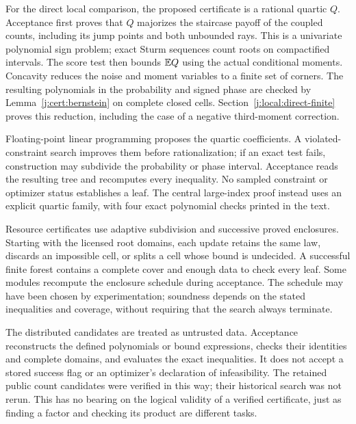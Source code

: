 For the direct local comparison, the proposed certificate is a rational
quartic $Q$. Acceptance first proves that $Q$ majorizes the staircase
payoff of the coupled counts, including its jump points and both
unbounded rays. This is a univariate polynomial sign problem; exact
Sturm sequences count roots on compactified intervals. The score test
then bounds $\mathbb E Q$ using the actual conditional moments. Concavity
reduces the noise and moment variables to a finite set of corners.
The resulting polynomials in the probability and signed phase are
checked by Lemma~\ref{j:cert:bernstein} on complete closed cells.
Section~\ref{j:local:direct-finite} proves this reduction, including
the case of a negative third-moment correction.

Floating-point linear programming proposes the quartic coefficients.
A violated-constraint search improves them before rationalization;
if an exact test fails, construction may subdivide the probability or
phase interval. Acceptance reads the resulting tree and recomputes every
inequality. No sampled constraint or optimizer status establishes a leaf.
The central large-index proof instead uses an explicit quartic family,
with four exact polynomial checks printed in the text.

Resource certificates use adaptive subdivision and successive proved
enclosures. Starting with the licensed root domains, each update retains
the same law, discards an impossible cell, or splits a cell whose bound
is undecided. A successful finite forest contains a complete cover and
enough data to check every leaf. Some modules recompute the enclosure
schedule during acceptance. The schedule may have been chosen by
experimentation; soundness depends on the stated inequalities and
coverage, without requiring that the search always terminate.

The distributed candidates are treated as untrusted data. Acceptance
reconstructs the defined polynomials or bound expressions, checks their
identities and complete domains, and evaluates the exact inequalities.
It does not accept a stored success flag or an optimizer's declaration
of infeasibility. The retained public count candidates were verified in this
way; their historical search was not rerun. This has no bearing on the
logical validity of a verified certificate, just as finding a factor
and checking its product are different tasks.

